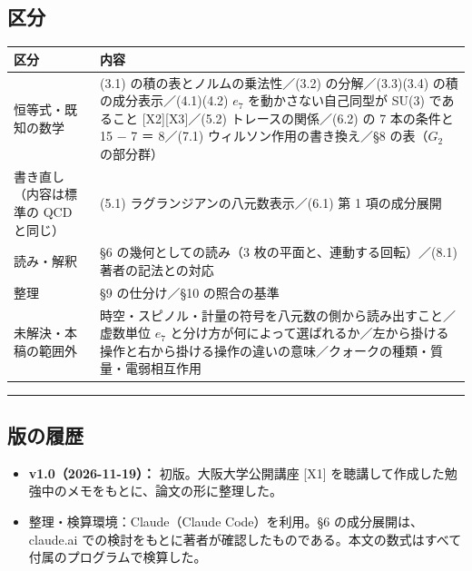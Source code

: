 \documentclass[
  a4paper,
]{ltjsarticle}
\newcounter{none} %
\providecommand{\tightlist}{%
  \setlength{\itemsep}{0pt}\setlength{\parskip}{0pt}}
\begin{document}
\subsection{区分}\label{ux533aux5206}

{\def\LTcaptype{none} %
\begin{longtable}[]{@{}
  >{\raggedright\arraybackslash}p{}
  >{\raggedright\arraybackslash}p{}@{}}
\toprule\noalign{}
\begin{minipage}[b]{\linewidth}\raggedright
区分
\end{minipage} & \begin{minipage}[b]{\linewidth}\raggedright
内容
\end{minipage} \\
\midrule\noalign{}
\endhead
\bottomrule\noalign{}
\endlastfoot
恒等式・既知の数学 & (3.1) の積の表とノルムの乗法性／(3.2)
の分解／(3.3)(3.4) の積の成分表示／(4.1)(4.2) \(e_7\)
を動かさない自己同型が SU(3) であること {[}X2{]}{[}X3{]}／(5.2)
トレースの関係／(6.2) の 7 本の条件と 15 − 7 ＝ 8／(7.1)
ウィルソン作用の書き換え／§8 の表（\(G_2\) の部分群） \\
書き直し（内容は標準の QCD と同じ） & (5.1)
ラグランジアンの八元数表示／(6.1) 第 1 項の成分展開 \\
読み・解釈 & §6 の幾何としての読み（3 枚の平面と、連動する回転）／(8.1)
著者の記法との対応 \\
整理 & §9 の仕分け／§10 の照合の基準 \\
未解決・本稿の範囲外 &
時空・スピノル・計量の符号を八元数の側から読み出すこと／虚数単位 \(e_7\)
と分け方が何によって選ばれるか／左から掛ける操作と右から掛ける操作の違いの意味／クォークの種類・質量・電弱相互作用 \\
\end{longtable}
}

\begin{center}\rule{0.5\linewidth}{0.5pt}\end{center}

\subsection{版の履歴}\label{ux7248ux306eux5c65ux6b74}

\begin{itemize}
\tightlist
\item
  \textbf{v1.0（2026-11-19）：} 初版。大阪大学公開講座 {[}X1{]}
  を聴講して作成した勉強中のメモをもとに、論文の形に整理した。
\item
  整理・検算環境：Claude（Claude Code）を利用。§6
  の成分展開は、claude.ai
  での検討をもとに著者が確認したものである。本文の数式はすべて付属のプログラムで検算した。
\end{itemize}
\end{document}
